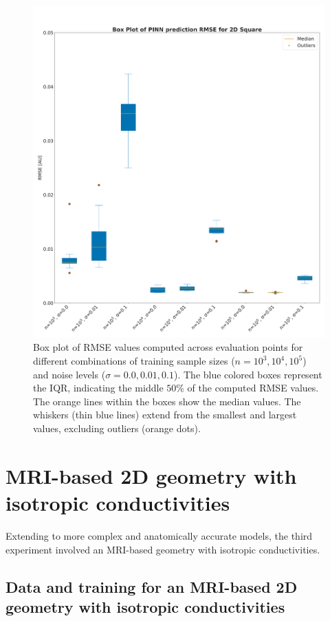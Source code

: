 \begin{figure}[H]
  \centering
  \includegraphics[width=\textwidth]{Figs/1D/box_plot_2D_final.pdf}
  \caption{Box plot of RMSE values computed across evaluation points for different combinations of training sample sizes ($n=10^3,10^4,10^5$) and noise levels ($\sigma=0.0,0.01,0.1$). The blue colored boxes represent the IQR, indicating the middle $50\%$ of the computed RMSE values. The orange lines within the boxes show the median values. The whiskers (thin blue lines) extend from the smallest and largest values, excluding outliers (orange dots).}
  \label{fig:RMSE_2D}
\end{figure}

\section{MRI-based 2D geometry with isotropic conductivities}
Extending to more complex and anatomically accurate models, the third experiment involved an MRI-based geometry with isotropic conductivities. 


%
\subsection{Data and training for an MRI-based 2D geometry with isotropic conductivities}

